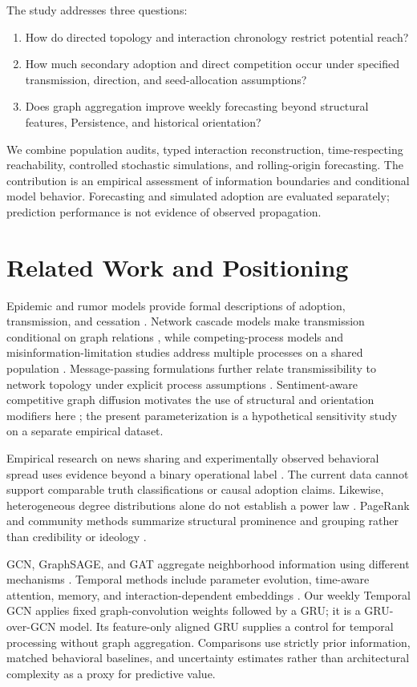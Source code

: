 \documentclass[11pt,a4paper]{article}
\begin{document}
The study addresses three questions:
\begin{enumerate}[label=\textbf{RQ\arabic*:},leftmargin=16mm]
\item How do directed topology and interaction chronology restrict potential reach?
\item How much secondary adoption and direct competition occur under specified transmission, direction, and seed-allocation assumptions?
\item Does graph aggregation improve weekly forecasting beyond structural features, Persistence, and historical orientation?
\end{enumerate}
We combine population audits, typed interaction reconstruction, time-respecting reachability, controlled stochastic simulations, and rolling-origin forecasting. The contribution is an empirical assessment of information boundaries and conditional model behavior. Forecasting and simulated adoption are evaluated separately; prediction performance is not evidence of observed propagation.

\section{Related Work and Positioning}
Epidemic and rumor models provide formal descriptions of adoption, transmission, and cessation \citep{kermack1927,daley1964}. Network cascade models make transmission conditional on graph relations \citep{kempe2003}, while competing-process models and misinformation-limitation studies address multiple processes on a shared population \citep{shir2016,budak2011,lu2024}. Message-passing formulations further relate transmissibility to network topology under explicit process assumptions \citep{karrer2010}. Sentiment-aware competitive graph diffusion motivates the use of structural and orientation modifiers here \citep{sharma2026}; the present parameterization is a hypothetical sensitivity study on a separate empirical dataset.

Empirical research on news sharing and experimentally observed behavioral spread uses evidence beyond a binary operational label \citep{vosoughi2018,centola2010}. The current data cannot support comparable truth classifications or causal adoption claims. Likewise, heterogeneous degree distributions alone do not establish a power law \citep{clauset2009}. PageRank and community methods summarize structural prominence and grouping rather than credibility or ideology \citep{brin1998,traag2019}.

GCN, GraphSAGE, and GAT aggregate neighborhood information using different mechanisms \citep{kipf2017,hamilton2017,velickovic2018}. Temporal methods include parameter evolution, time-aware attention, memory, and interaction-dependent embeddings \citep{pareja2020,xu2020,rossi2020,kumar2019}. Our weekly Temporal GCN applies fixed graph-convolution weights followed by a GRU; it is a GRU-over-GCN model. Its feature-only aligned GRU supplies a control for temporal processing without graph aggregation. Comparisons use strictly prior information, matched behavioral baselines, and uncertainty estimates rather than architectural complexity as a proxy for predictive value.
\end{document}
